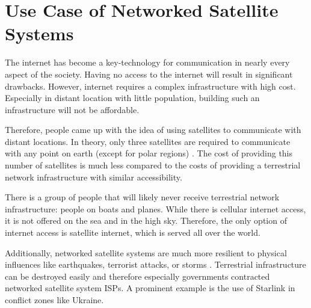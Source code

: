 \section{Use Case of Networked Satellite Systems} \label{sec:usecase-networked-satellite-systems}

The internet has become a key-technology for
communication in nearly every aspect of the society. Having no access to the
internet will result in significant drawbacks. However, internet requires a
complex infrastructure with high cost. Especially in distant location with
little population, building such an infrastructure will not be affordable.

Therefore, people came up with the idea of using satellites to communicate with
distant locations. In theory, only three satellites are required to communicate
with any point on earth (except for polar regions)
\cite{DBLP:conf/5gwf/HofmannK19}. The cost of providing this number of
satellites is much less compared to the costs of providing a terrestrial
network infrastructure with similar accessibility.

There is a group of people that will likely never receive terrestrial network
infrastructure: people on boats and planes. While there is cellular internet
access, it is not offered on the sea and in the high sky. Therefore, the only
option of internet access is satellite internet, which is served all over the
world.

Additionally, networked satellite systems are much more resilient to physical
influences like earthquakes, terrorist attacks, or storms
\cite{DBLP:conf/pam/StevensIBD24}. Terrestrial infrastructure can be destroyed
easily and therefore especially governments contracted networked satellite
system ISPs. A prominent example is the use of Starlink in conflict zones like
Ukraine.

